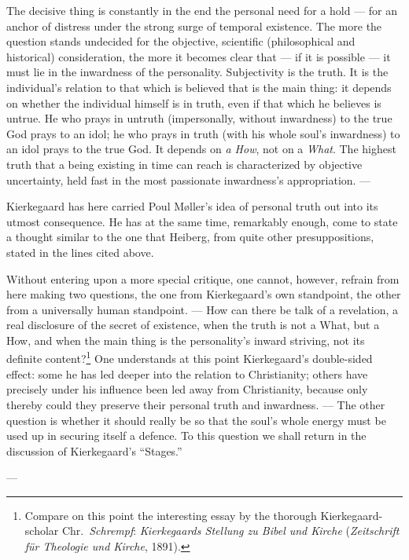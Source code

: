 \documentclass[12pt,a4paper]{book}
\newcommand{\opage}[1]{\marginnote{\footnotesize\textit{[#1]}}}
\begin{document}
The decisive thing is constantly in the end the personal need for a hold --- for an anchor
of distress under the strong surge of temporal existence. The more the question stands
undecided for the objective, scientific (philosophical and historical) consideration, the
more it becomes clear that --- if it is possible --- it must lie in the inwardness of the
personality. Subjectivity is the truth. It is the individual's relation to that which is
believed that is the main thing: it depends on whether the individual himself is in truth,
even if that which he believes is untrue. He who prays in untruth (impersonally, without
inwardness) to the true God prays to an idol; he who prays in truth (with his whole soul's
inwardness) to an idol prays to the true God. It depends on \emph{a How}, not on a
\emph{What}. The highest truth that a being existing in time can reach is characterized by
objective uncertainty, held fast in the most passionate inwardness's appropriation. ---

Kierkegaard has here carried Poul Møller's idea of personal truth out into its utmost
consequence. He has at the same time, remarkably enough, come to state a thought similar to
the one that Heiberg, from quite other presuppositions, stated in the lines cited above.

Without entering upon a more special critique, one cannot, however, refrain from here making
two questions, the one from Kierkegaard's own standpoint, the other from a universally human
standpoint. --- How can there be talk of a revelation, a real disclosure of the secret of
existence, when the truth is not a What, but a How, and when the main thing is the
personality's inward striving, not its definite content?\footnote{Compare on this point the
interesting essay by the thorough Kierkegaard-scholar Chr.\ \emph{Schrempf}: \emph{Kierkegaards
Stellung zu Bibel und Kirche} (\emph{Zeitschrift für Theologie und Kirche}, 1891).} One
understands at this point Kierkegaard's double-sided effect: some he has led deeper \opage{156}into the
relation to Christianity; others have precisely under his influence been led away from
Christianity, because only thereby could they preserve their personal truth and inwardness.
--- The other question is whether it should really be so that the soul's whole energy must
be used up in securing itself a defence. To this question we shall return in the discussion
of Kierkegaard's ``Stages.''

\begin{center}---\end{center}
\end{document}
